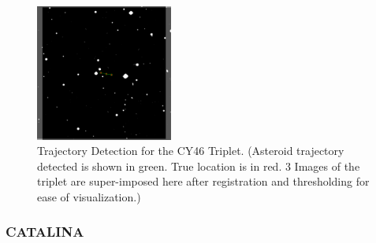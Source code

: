 

\begin{figure}[t]
\begin{center}
\includegraphics[width=0.4\textwidth]{Figures/NEATLines_LogicalImg.pdf}
\end{center}
\caption{Trajectory Detection for the CY46 Triplet. (Asteroid trajectory detected is shown in green. True location is in red. 3 Images of the triplet are super-imposed here after registration and thresholding for ease of visualization.)}
\label{fig:NEAT}
\end{figure}
\subsubsection{CATALINA}



